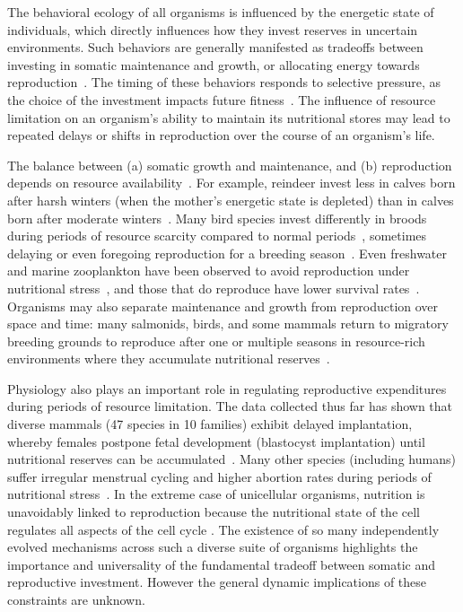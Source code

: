 \documentclass[twocolumn,preprintnumbers,amsmath,amssymb,superscriptaddress]{revtex4}
\begin{document}
\maketitle

\begin{bibunit}[unsrt]



The behavioral ecology of all organisms is influenced by the energetic state of individuals, which directly influences how they invest reserves in uncertain environments.
Such behaviors are generally manifested as tradeoffs between investing in somatic maintenance and growth, or allocating energy towards reproduction~\citep{Martin:1987dl,Kirk:1997cc,Kempes:2012hy}.
The timing of these behaviors responds to selective pressure, as the choice of the investment impacts future fitness~\citep{Mangel:1988uaa,Mangel:2014kz,Yeakel:2013hi}.
The influence of resource limitation on an organism's ability to maintain its nutritional stores may lead to repeated delays or shifts in reproduction over the course of an organism's life.

The balance between (a) somatic growth and maintenance, and (b) reproduction depends on resource availability~\citep{Morris:1987eo}.
For example, reindeer invest less in calves born after harsh winters (when the mother's energetic state is depleted) than in calves born after moderate winters~\citep{Tveraa:2003fq}.
Many bird species invest differently in broods during periods of resource scarcity compared to normal periods~\citep{Daan:1988va,Jacot:2009dv}, sometimes delaying or even foregoing reproduction for a breeding season~\citep{Martin:1987dl,Stearns:1989ip,Barboza:2002in}.
Even freshwater and marine zooplankton have been observed to avoid reproduction under nutritional stress~\citep{Threlkeld:1976ih}, and those that do reproduce have lower survival rates~\citep{Kirk:1997cc}.
Organisms may also separate maintenance and growth from reproduction over space and time: many salmonids, birds, and some mammals return to migratory breeding grounds to reproduce after one or multiple seasons in resource-rich environments where they accumulate nutritional reserves~\citep{Weber:1998jg,Mduma:1999cp,Moore:2014hi}.

Physiology also plays an important role in regulating reproductive expenditures during periods of resource limitation.
The data collected thus far has shown that diverse mammals (47 species in 10 families) exhibit delayed implantation, whereby females postpone fetal development (blastocyst implantation) until nutritional reserves can be accumulated~\citep{Mead:1989dt,Sandell:1990kw}.
Many other species (including humans) suffer irregular menstrual cycling and higher abortion rates during periods of nutritional stress~\citep{Bulik:1999eo,Trites:2003cc}.
In the extreme case of unicellular organisms, nutrition is unavoidably linked to reproduction because the nutritional state of the cell regulates all aspects of the cell cycle \citep{Glazier:2009hq}.
The existence of so many independently evolved mechanisms across such a diverse suite of organisms highlights the importance and universality of the fundamental tradeoff between somatic and reproductive investment.
However the general dynamic implications of these constraints are unknown.


\end{bibunit}
\end{document}
